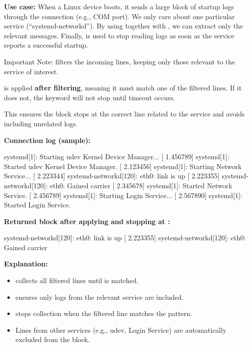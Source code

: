 \textbf{Use case:}
When a Linux device boots, it sends a large block of startup logs through the connection (e.g., COM port).
We only care about one particular service (``systemd-networkd''). By using  together with ,
we can extract only the relevant messages. Finally,  is used to stop reading logs as soon as the service reports a successful startup.

\begin{boxhint} {Important Note:}
 filters the incoming lines, keeping only those relevant to the service of interest.

 is applied \textbf{after filtering}, meaning it must match one of the filtered lines.
If it does not, the keyword will not stop until timeout occurs.

This ensures the block stops at the correct line related to the service and avoids including unrelated logs.
\end{boxhint}


\textbf{Connection log (sample):}
\begin{robotlog}
[    1.234567] systemd[1]: Starting udev Kernel Device Manager...
[    1.456789] systemd[1]: Started udev Kernel Device Manager.
[    2.123456] systemd[1]: Starting Network Service...
[    2.223344] systemd-networkd[120]: eth0: link is up
[    2.223355] systemd-networkd[120]: eth0: Gained carrier
[    2.345678] systemd[1]: Started Network Service.
[    2.456789] systemd[1]: Starting Login Service...
[    2.567890] systemd[1]: Started Login Service.
\end{robotlog}

\textbf{Returned block after applying  and stopping at :}
\begin{robotlog}
[    2.223344] systemd-networkd[120]: eth0: link is up
[    2.223355] systemd-networkd[120]: eth0: Gained carrier
\end{robotlog}

\textbf{Explanation:}
\begin{itemize}
  \item {} collects all filtered lines until  is matched.
  \item {} ensures only logs from the relevant service are included.
  \item {} stops collection when the filtered line matches the pattern.
  \item Lines from other services (e.g., udev, Login Service) are automatically excluded from the block.
\end{itemize}



